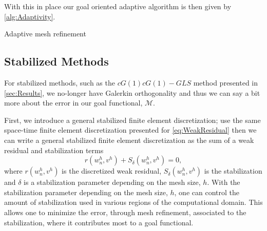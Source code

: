 With this in place our goal oriented adaptive algorithm is then given by
\autoref{alg:Adaptivity}.
\begin{algorithm}[!htp]
  \caption{Adaptive mesh refinement} \label{alg:Adaptivity}
\begin{minipage}[t]{\columnwidth} %
  \SetAlgoLined
\end{minipage}
\end{algorithm}

\subsection{Stabilized Methods}
For stabilized methods, such as the $cG(1)cG(1)-GLS$ method presented in
\autoref{sec:Results}, we no-longer have Galerkin orthogonality and thus we can
say a bit more about the error in our goal functional, $\mathcal{M}$.

First, we introduce a general stabilized finite element discretization; use
the same space-time finite element discretization presented for
\eqref{eq:WeakResidual} then we can write a general stabilized finite element
discretization as the sum of a weak residual and stabilization terms
\begin{equation}
    r(w^h_n, v^h) + S_{\delta}(w^h_n, v^h) = 0,
    \label{eq:StableWeakResidual}
\end{equation}
where $r(w^h_n, v^h)$ is the discretized weak residual, $S_{\delta}(w^h_n, v^h)$
is the stabilization and $\delta$ is a stabilization parameter depending on the
mesh size, $h$. With the stabilization parameter depending on the mesh size,
$h$, one can control the amount of stabilization used in various regions of the
computational domain. This allows one to minimize the error, through
mesh refinement, associated to the stabilization, where it contributes most to a
goal functional.

